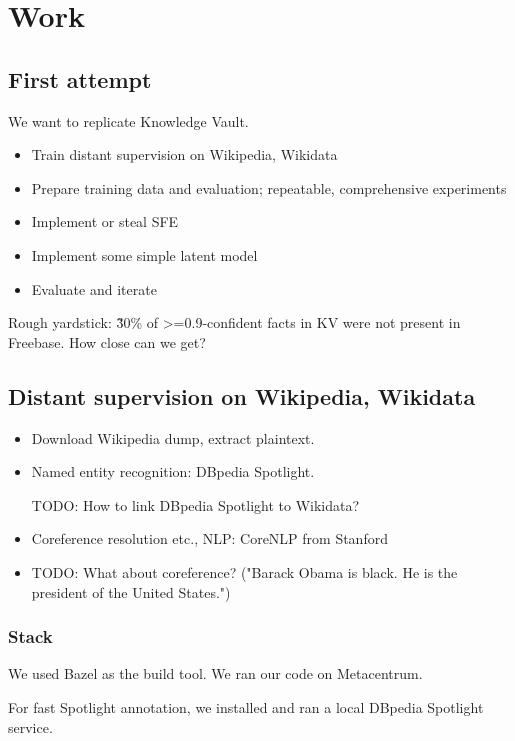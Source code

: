 \chapter{Work}

\section{First attempt}

We want to replicate Knowledge Vault.
\begin{itemize}
\item Train distant supervision on Wikipedia, Wikidata
\item Prepare training data and evaluation; repeatable, comprehensive
experiments
\item Implement or steal SFE
\item Implement some simple latent model
\item Evaluate and iterate
\end{itemize}
Rough yardstick: \~30\% of >=0.9-confident facts in KV were not present in
Freebase. How close can we get?

\section{Distant supervision on Wikipedia, Wikidata}

\begin{itemize}
\item Download Wikipedia dump, extract plaintext.
\item Named entity recognition: DBpedia Spotlight\cite{dbpedia-spotlight}.

	TODO: How to link DBpedia Spotlight to Wikidata?

\item Coreference resolution etc., NLP: CoreNLP from Stanford\cite{stanford-corenlp}

\item TODO: What about coreference? ("Barack Obama is black. He is the
president of the United States.")
\end{itemize}

\subsection{Stack}

We used Bazel as the build tool. We ran our code on Metacentrum.

For fast Spotlight annotation, we installed and ran a local DBpedia Spotlight
service.
